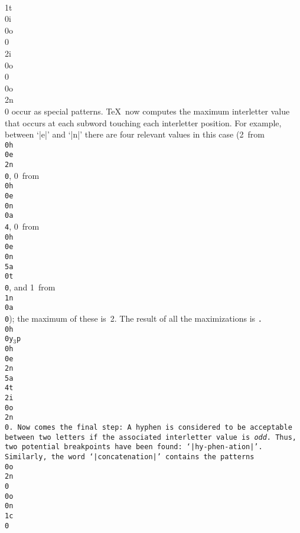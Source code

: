   \\1t\\0i\\0o\\0 \\2i\\0o\\0 \\0o\\2n\\0\cr
\enddisplay
occur as special patterns. \TeX\ now computes the maximum interletter
value that occurs at each subword touching each interletter position.
For example, between `|e|' and `|n|' there are four relevant values
in this case (2~from {\tt\\0h\\0e\\2n\\0},
0~from {\tt\\0h\\0e\\0n\\0a\\4},
0~from {\tt\\0h\\0e\\0n\\5a\\0t\\0},
and 1~from {\tt\\1n\\0a\\0}); the maximum of these is~2.
The result of all the maximizations is
\begindisplay
\tt.\\0h\\0y$_3$p\\0h\\0e\\2n\\5a\\4t\\2i\\0o\\2n\\0.
\enddisplay
Now comes the final step: A hyphen is considered to be acceptable
between two letters if the associated interletter value is {\sl odd}.
Thus, two potential breakpoints have been found: `|hy-phen-ation|'.
Similarly, the word `|concatenation|' contains the patterns
\begindisplay
\tt\\0o\\2n\\0
\\0o\\0n\\1c\\0
